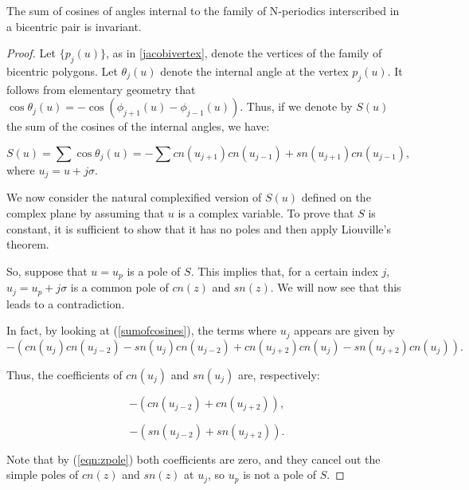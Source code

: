 

\begin{theorem}
The sum of cosines of angles internal to the family of N-periodics interscribed in a bicentric pair is invariant.
\label{thm:bicentric-sum}
\end{theorem}

\begin{proof}
Let $\{p_{j}(u)\}$, as in  \eqref{jacobivertex}, denote the vertices of the family of bicentric polygons. Let $\theta_{j}(u)$ denote the internal angle at the vertex $p_{j}(u)$. It follows from elementary geometry that
$\cos{\theta_{j}(u)}=-\cos({\phi_{j+1}(u)-\phi_{j-1}(u)}).$
Thus, if we denote by $S(u)$ the sum of the cosines of the internal angles, we have:

\begin{equation}
\label{sumofcosines}
S(u)=\sum \cos{\theta_{j}(u)}=-\sum{cn(u_{j+1})cn(u_{j-1})+sn(u_{j+1})cn(u_{j-1})},
\end{equation}
where $u_{j}=u+j\sigma$.

We now consider the natural complexified version of $S(u)$ defined on the complex plane by assuming that $u$ is a complex variable. To prove that $S$ is constant, it is sufficient to show that it has no poles and then apply Liouville's theorem.

So, suppose that $u=u_p$ is a pole of $S$. This implies that, for a certain index $j$, $u_{j}=u_{p}+j\sigma$ is a common pole of $cn(z)$ and $sn(z)$. We will now see that this leads to a contradiction.

In fact, by looking at (\ref{sumofcosines}), the terms where $u_{j}$ appears are given by
$$-(cn(u_{j})cn(u_{j-2})-sn(u_{j})cn(u_{j-2})+cn(u_{j+2})cn(u_{j})-sn(u_{j+2})cn(u_{j})).$$

Thus, the coefficients of $cn(u_{j})$ and $sn(u_{j})$ are, respectively:

$$-(cn(u_{j-2})+cn(u_{j+2})),$$

$$-(sn(u_{j-2})+sn(u_{j+2})).$$

Note that by (\ref{eqn:zpole}) both coefficients are zero, and they cancel out the simple poles of $cn(z)$ and $sn(z)$ at $u_{j}$, so $u_{p}$ is not a pole of $S$.   
\end{proof}

